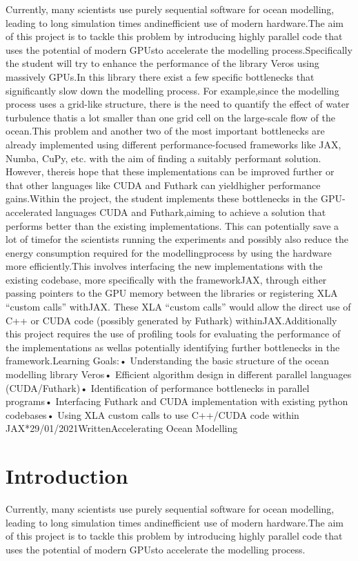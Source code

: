 \documentclass[a4paper,oneside]{memoir}
\begin{document}
Currently, many scientists use purely sequential software for ocean modelling, leading to long simulation times andinefficient use of modern hardware.The aim of this project is to tackle this problem by introducing highly parallel code that uses the potential of modern GPUsto accelerate the modelling process.Specifically the student will try to enhance the performance of the library Veros using massively GPUs.In this library there exist a few specific bottlenecks that significantly slow down the modelling process. For example,since the modelling process uses a grid-like structure, there is the need to quantify the effect of water turbulence thatis a lot smaller than one grid cell on the large-scale flow of the ocean.This problem and another two of the most important bottlenecks are already implemented using different performance-focused frameworks like JAX, Numba, CuPy, etc. with the aim of finding a suitably performant solution. However, thereis hope that these implementations can be improved further or that other languages like CUDA and Futhark can yieldhigher performance gains.Within the project, the student implements these bottlenecks in the GPU-accelerated languages CUDA and Futhark,aiming to achieve a solution that performs better than the existing implementations. This can potentially save a lot of timefor the scientists running the experiments and possibly also reduce the energy consumption required for the modellingprocess by using the hardware more efficiently.This involves interfacing the new implementations with the existing codebase, more specifically with the frameworkJAX, through either passing pointers to the GPU memory between the libraries or registering XLA “custom calls” withJAX. These XLA “custom calls” would allow the direct use of C++ or CUDA code (possibly generated by Futhark) withinJAX.Additionally this project requires the use of profiling tools for evaluating the performance of the implementations as wellas potentially identifying further bottlenecks in the framework.Learning Goals:• Understanding the basic structure of the ocean modelling library Veros• Efficient algorithm design in different parallel languages (CUDA/Futhark)• Identification of performance bottlenecks in parallel programs• Interfacing Futhark and CUDA implementation with existing python codebases• Using XLA custom calls to use C++/CUDA code within JAX*29/01/2021WrittenAccelerating Ocean Modelling
\fi
\section{Introduction}
Currently, many scientists use purely sequential software for ocean modelling, leading to long simulation times andinefficient use of modern hardware.The aim of this project is to tackle this problem by introducing highly parallel code that uses the potential of modern GPUsto accelerate the modelling process.
\end{document}
